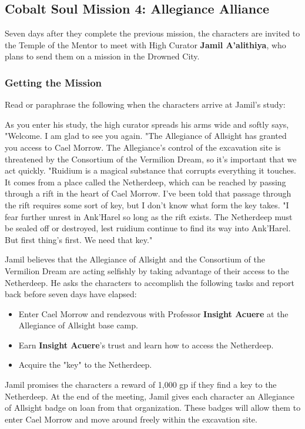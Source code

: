 \documentclass[10pt,a4,twoside,twocolumn,openany,nodeprecatedcode]{dndbook}
\begin{document}
\subsection{Cobalt Soul Mission 4: Allegiance Alliance}
Seven days after they complete the previous mission, the characters are invited to the Temple of the Mentor to meet with High Curator \textbf{Jamil A'alithiya}, who plans to send them on a mission in the Drowned City.
\subsubsection{Getting the Mission}
Read or paraphrase the following when the characters arrive at Jamil's study:
\begin{DndReadAloud}{}
As you enter his study, the high curator spreads his arms wide and softly says, "Welcome. I am glad to see you again.
"The Allegiance of Allsight has granted you access to Cael Morrow. The Allegiance's control of the excavation site is threatened by the Consortium of the Vermilion Dream, so it's important that we act quickly.
"Ruidium is a magical substance that corrupts everything it touches. It comes from a place called the Netherdeep, which can be reached by passing through a rift in the heart of Cael Morrow. I've been told that passage through the rift requires some sort of key, but I don't know what form the key takes.
"I fear further unrest in Ank'Harel so long as the rift exists. The Netherdeep must be sealed off or destroyed, lest ruidium continue to find its way into Ank'Harel. But first thing's first. We need that key."
\end{DndReadAloud}

Jamil believes that the Allegiance of Allsight and the Consortium of the Vermilion Dream are acting selfishly by taking advantage of their access to the Netherdeep. He asks the characters to accomplish the following tasks and report back before seven days have elapsed:
\begin{itemize}

\item Enter Cael Morrow and rendezvous with Professor \textbf{Insight Acuere} at the Allegiance of Allsight base camp.
\item Earn \textbf{Insight Acuere}'s trust and learn how to access the Netherdeep.
\item Acquire the "key" to the Netherdeep.
\end{itemize}


Jamil promises the characters a reward of 1,000 gp if they find a key to the Netherdeep.
At the end of the meeting, Jamil gives each character an Allegiance of Allsight badge on loan from that organization. These badges will allow them to enter Cael Morrow and move around freely within the excavation site.
\end{document}
